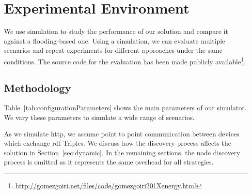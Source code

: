 \section{Experimental Environment}
\label{environment}
We use simulation to study the performance of our solution and compare it against a flooding-based one.
Using a simulation, we can evaluate multiple scenarios and repeat experiments for different approaches under the same conditions.
The source code for the evaluation has been made publicly available\footnote{\url{http://gomezgoiri.net/files/code/gomezgoiri201Xenergy.html}}.

\subsection{Methodology}
Table~\ref{tab:configurationParameters} shows the main parameters of our simulator.
We vary these parameters to simulate a wide range of scenarios.





As we simulate \ac{http}, we assume point to point communication between devices which exchange \ac{rdf} Triples.
We discuss how the discovery process affects the solution in Section~\ref{sec:dynamic}.
In the remaining sections, the node discovery process is omitted as it represents the same overhead for all strategies.


